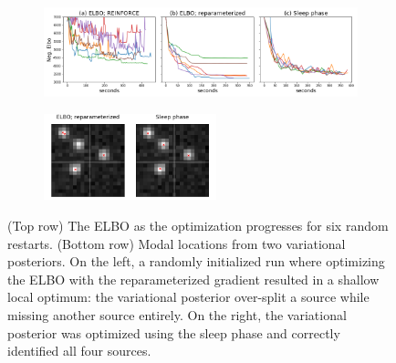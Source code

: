 \begin{figure}[!htb]
    \centering
    \begin{subfigure}[t]{0.9\textwidth}
    \centering
    \includegraphics[width=\textwidth]{figures/elbo_vs_sleep/optim_path_compare.png}
    \end{subfigure}
    \begin{subfigure}[t]{\textwidth}
    \centering
    \includegraphics[width=0.55\textwidth]{figures/elbo_vs_sleep/optim_path_detect_compare.png}
    \end{subfigure}
    \vspace{-3em}
    \caption{(Top row) The ELBO as the optimization progresses for six random restarts. 
    (Bottom row) Modal locations from two variational posteriors.
    On the left, a randomly initialized run where optimizing the ELBO with the reparameterized gradient resulted in a shallow local optimum: the variational posterior over-split a source while missing another source entirely.  
    On the right, the variational posterior 
    was optimized using the sleep phase and correctly identified all four sources. }
    \label{fig:optim_path}
\end{figure}


